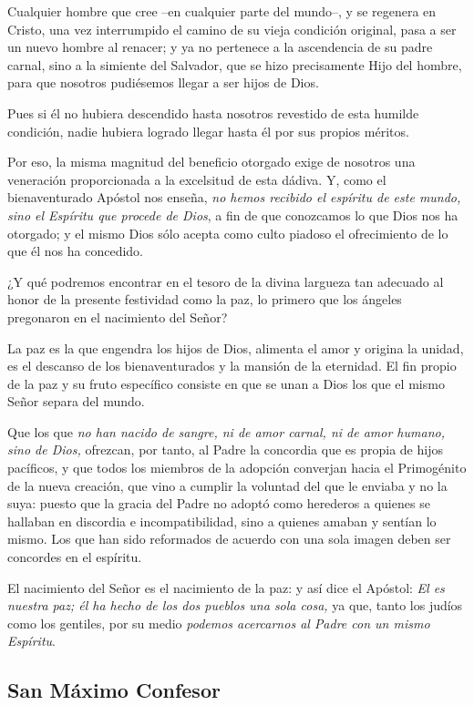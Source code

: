 Cualquier hombre que cree --en cualquier parte del mundo--, y se regenera en Cristo, una vez interrumpido el camino de su vieja condición original, pasa a ser un nuevo hombre al renacer; y ya no pertenece a la ascendencia de su padre carnal, sino a la simiente del Salvador, que se hizo precisamente Hijo del hombre, para que nosotros pudiésemos llegar a ser hijos de Dios.

Pues si él no hubiera descendido hasta nosotros revestido de esta humilde condición, nadie hubiera logrado llegar hasta él por sus propios méritos.

Por eso, la misma magnitud del beneficio otorgado exige de nosotros una veneración proporcionada a la excelsitud de esta dádiva. Y, como el bienaventurado Apóstol nos enseña, \emph{no hemos recibido el espíritu de este mundo, sino el Espíritu que procede de Dios}, a fin de que conozcamos lo que Dios nos ha otorgado; y el mismo Dios sólo acepta como culto piadoso el ofrecimiento de lo que él nos ha concedido.

¿Y qué podremos encontrar en el tesoro de la divina largueza tan adecuado al honor de la presente festividad como la paz, lo primero que los ángeles pregonaron en el nacimiento del Señor?

La paz es la que engendra los hijos de Dios, alimenta el amor y origina la unidad, es el descanso de los bienaventurados y la mansión de la eternidad. El fin propio de la paz y su fruto específico consiste en que se unan a Dios los que el mismo Señor separa del mundo.

Que los que \emph{no han nacido de sangre, ni de amor carnal, ni de amor humano, sino de Dios,} ofrezcan, por tanto, al Padre la concordia que es propia de hijos pacíficos, y que todos los miembros de la adopción converjan hacia el Primogénito de la nueva creación, que vino a cumplir la voluntad del que le enviaba y no la suya: puesto que la gracia del Padre no adoptó como herederos a quienes se hallaban en discordia e incompatibilidad, sino a quienes amaban y sentían lo mismo. Los que han sido reformados de acuerdo con una sola imagen deben ser concordes en el espíritu.

El nacimiento del Señor es el nacimiento de la paz: y así dice el Apóstol: \emph{El es nuestra paz; él ha hecho de los dos pueblos una sola cosa,} ya que, tanto los judíos como los gentiles, por su medio \emph{podemos acercarnos al Padre con un mismo Espíritu}.

\subsection{San Máximo Confesor}

